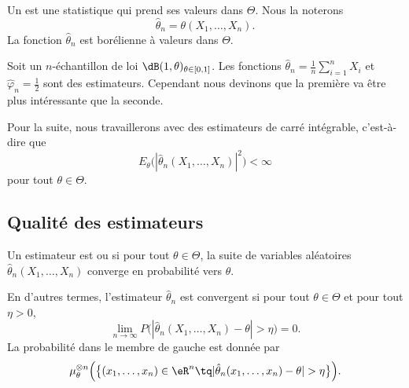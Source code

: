 Un  est une statistique qui prend ses valeurs dans \( \Theta\). Nous la noterons
\begin{equation}
	\hat\theta_n=\theta(X_1,\ldots,X_n).
\end{equation}
La fonction \( \hat\theta_n\) est borélienne à valeurs dans \( \Theta\).

\begin{example}
	Soit un \( n\)-échantillon de loi \( \dB(1,\theta)_{\theta\in\mathopen[ 0 , 1 \mathclose]}\). Les fonctions \( \hat\theta_n=\frac{1}{ n }\sum_{i=1}^nX_i\) et \( \hat\varphi_n=\frac{ 1 }{2}\) sont des estimateurs. Cependant nous devinons que la première va être plus intéressante que la seconde.
\end{example}

Pour la suite, nous travaillerons avec des estimateurs de carré intégrable, c'est-à-dire que
\begin{equation}
	E_{\theta}\big( | \hat\theta_n(X_1,\ldots,X_n) |^2 \big)<\infty
\end{equation}
pour tout \( \theta\in\Theta\).

\subsection{Qualité des estimateurs}

\begin{definition}
	Un estimateur est  ou  si pour tout \( \theta\in\Theta\), la suite de variables aléatoires \( \hat\theta_n(X_1,\ldots,X_n)\) converge en probabilité vers \( \theta\).
\end{definition}
En d'autres termes, l'estimateur \( \hat\theta_n\) est convergent si pour tout \( \theta\in\Theta\) et pour tout \( \eta>0\),
\begin{equation}
	\lim_{n\to \infty} P\big( | \hat\theta_n(X_1,\ldots,X_n)-\theta |>\eta \big)=0.
\end{equation}
La probabilité dans le membre de gauche est donnée par
\begin{equation}
	\mu^{\otimes n}_{\theta}\Big( \big\{ (x_1,\ldots,x_n)\in\eR^n\tq| \hat\theta_n(x_1,\ldots,x_n)-\theta |>\eta \big\} \Big).
\end{equation}


